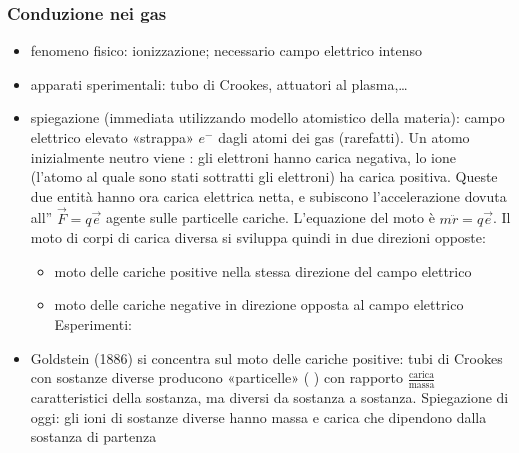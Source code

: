 \documentclass[letterpaper,10pt,italian]{jupyterBook}
\begin{document}
\subsubsection{Conduzione nei gas}
\label{\detokenize{ch/electromagnetism/electric-current:conduzione-nei-gas}}\label{\detokenize{ch/electromagnetism/electric-current:physics-hs-electromagnetism-electric-current-gas}}
\sphinxAtStartPar
{} 
\begin{itemize}
\item {} 
\sphinxAtStartPar
fenomeno fisico: ionizzazione; necessario campo elettrico intenso \sphinxstylestrong{(!)}

\item {} 
\sphinxAtStartPar
apparati sperimentali: tubo di Crookes, attuatori al plasma,…

\item {} 
\sphinxAtStartPar
spiegazione (immediata utilizzando modello atomistico della materia): campo elettrico elevato «strappa» \(e^-\) dagli atomi dei gas (rarefatti). Un atomo inizialmente neutro viene : gli elettroni hanno carica negativa, lo ione (l’atomo al quale sono stati sottratti gli elettroni) ha carica positiva. Queste due entità hanno ora carica elettrica netta, e subiscono l’accelerazione dovuta all”{\hyperref[\detokenize{ch/electromagnetism/electrostatics:physics-hs-electromagnetism-lorentz-electric}]{}} \(\vec{F} = q \vec{e}\) agente sulle particelle cariche. L’equazione del moto è \(m \ddot{r} = q \vec{e}\). Il moto di corpi di carica diversa si sviluppa quindi in due direzioni opposte:
\begin{itemize}
\item {} 
\sphinxAtStartPar
moto delle cariche positive nella stessa direzione del campo elettrico

\item {} 
\sphinxAtStartPar
moto delle cariche negative in direzione opposta al campo elettrico
Esperimenti:

\end{itemize}

\item {} 
\sphinxAtStartPar
Goldstein (1886) si concentra sul moto delle cariche positive: tubi di Crookes con sostanze diverse producono «particelle» ( ) con rapporto \(\frac{\text{carica}}{\text{massa}}\) caratteristici della sostanza, ma diversi da sostanza a sostanza. Spiegazione di oggi: gli ioni di sostanze diverse hanno massa e carica che dipendono dalla sostanza di partenza


\end{itemize}
\end{document}

